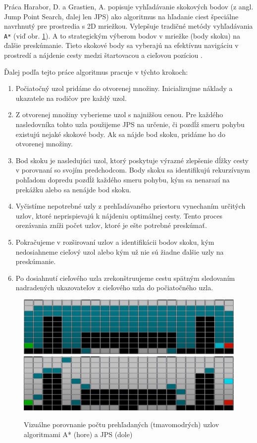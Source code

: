 Práca Harabor, D. a Grastien, A. popisuje vyhľadávanie skokových bodov (z angl. Jump Point Search, ďalej len JPS) ako algoritmus na hľadanie ciest špeciálne navrhnutý pre prostredia s 2D mriežkou. Vylepšuje tradičné metódy vyhľadávania \texttt{A*} (viď obr. \ref{fig:astar_vs_jps}). A to strategickým výberom bodov v  mriežke (body skoku) na ďalšie preskúmanie. Tieto skokové body sa vyberajú na efektívnu navigáciu v prostredí a nájdenie cesty medzi štartovacou a cieľovou pozíciou \cite{harabor2011online}.

\noindent
Ďalej podľa tejto práce algoritmus pracuje v týchto krokoch:
\begin{enumerate}
    \item Počiatočný uzol pridáme do otvorenej množiny. Inicializujme náklady a ukazatele na rodičov pre každý uzol.

    \item Z otvorenej množiny vyberieme uzol s najnižšou cenou. Pre každého nasledovníka tohto uzla použijeme JPS na určenie, či pozdĺž smeru pohybu existujú nejaké skokové body. Ak sa nájde bod skoku, pridáme ho do otvorenej množiny.

    \item Bod skoku je nasledujúci uzol, ktorý poskytuje výrazné zlepšenie dĺžky cesty v porovnaní so svojím predchodcom. Body skoku sa identifikujú rekurzívnym pohľadom dopredu pozdĺž každého smeru pohybu, kým sa nenarazí na prekážku alebo sa nenájde bod skoku.

    \item Vyčistíme nepotrebné uzly z prehľadávaného priestoru vynechaním určitých uzlov, ktoré neprispievajú k nájdeniu optimálnej cesty. Tento proces orezávania zníži počet uzlov, ktoré je ešte potrebné preskúmať.

    \item Pokračujeme v rozširovaní uzlov a identifikácii bodov skoku, kým nedosiahneme cieľový uzol alebo kým už nie sú žiadne ďalšie uzly na preskúmanie.

    \item Po dosiahnutí cieľového uzla zrekonštruujeme cestu spätným sledovaním nadradených ukazovateľov z cieľového uzla do počiatočného uzla.
\end{enumerate}

\begin{figure}[H]
    \centering
    \includegraphics[width=0.60\linewidth]{obrazky-figures/astar3.png}
    \includegraphics[width=0.60\linewidth]{obrazky-figures/jps.png}
    \caption{Vizuálne porovnanie počtu prehľadaných (tmavomodrých) uzlov algoritmami A* (hore) a JPS (dole)\protect\footnotemark }
    \label{fig:astar_vs_jps}
\end{figure}

